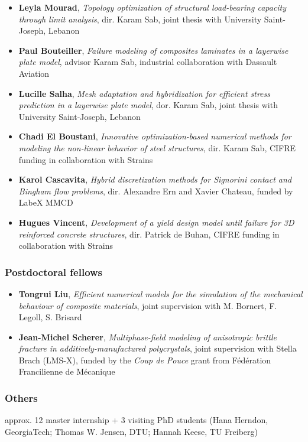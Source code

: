 \begin{itemize}[noitemsep]
\item[2018-2021] \textbf{Leyla Mourad}, \textit{Topology optimization of structural load-bearing capacity through limit analysis}, dir. Karam Sab, joint thesis with University Saint-Joseph, Lebanon
\item[2018-2021] \textbf{Paul Bouteiller}, \textit{Failure modeling of composites laminates in a layerwise plate model}, advisor Karam Sab, industrial collaboration with Dassault Aviation
\item[2017-2021] \textbf{Lucille Salha}, \textit{Mesh adaptation and hybridization for efficient stress prediction in a layerwise plate model}, dor. Karam Sab, joint thesis with University Saint-Joseph, Lebanon
\item[2017-2020] \textbf{Chadi El Boustani}, \textit{Innovative optimization-based numerical methods for modeling the non-linear behavior of steel structures}, dir. Karam Sab, CIFRE funding in collaboration with Strains
\item[2015-2018] \textbf{Karol Cascavita}, \textit{Hybrid discretization methods for Signorini contact and Bingham flow problems}, dir. Alexandre Ern and Xavier Chateau, funded by LabeX MMCD 
\item[2015-2018] \textbf{Hugues Vincent}, \textit{Development of a yield design model until failure for 3D reinforced concrete structures}, dir. Patrick de Buhan, CIFRE funding in collaboration with Strains
\end{itemize}

\subsubsection*{Postdoctoral fellows}

\begin{itemize}[noitemsep,leftmargin=*]
\item[2025] \textbf{Tongrui Liu}, \textit{Efficient numerical models for the simulation of the mechanical behaviour of composite materials}, joint supervision with M. Bornert, F. Legoll, S. Brisard
\item[2021] \textbf{Jean-Michel Scherer}, \textit{Multiphase-field modeling of anisotropic brittle fracture in additively-manufactured polycrystals}, joint supervision with Stella Brach (LMS-X), funded by the \textit{Coup de Pouce} grant from Fédération Francilienne de Mécanique
\end{itemize}

\subsubsection*{Others}
\noindent approx. 12 master internship +
3 visiting PhD students (Hana Herndon, GeorgiaTech; Thomas W. Jensen, DTU; Hannah Keese, TU Freiberg)


